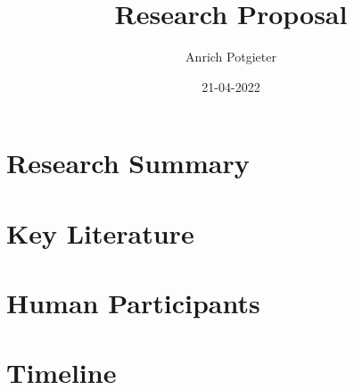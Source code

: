 \documentclass[12pt]{article}
\title{Research Proposal}
\author{Anrich Potgieter}
\date{21-04-2022}
\begin{document}
\maketitle
\tableofcontents

\section{Research Summary}


\section{Key Literature}

\section{Human Participants}

\section{Timeline}
\end{document}
